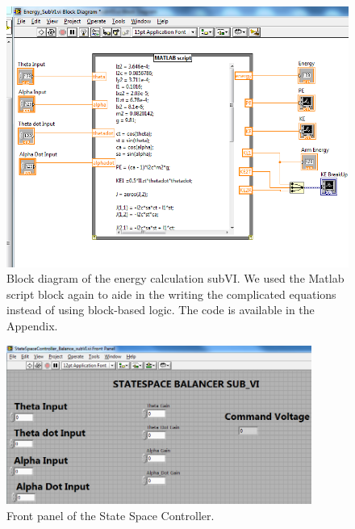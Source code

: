 \documentclass{article}
\theoremstyle{plain}
\theoremstyle{definition}
\theoremstyle{remark}
\begin{document}
\begin{figure}[htb]
\begin{center}
\includegraphics[width = 14cm]{q6_b6.png}
\end{center}
\caption{Block diagram of the energy calculation subVI. We used the Matlab script block again to aide in the writing the complicated equations instead of using block-based logic. The code is available in the Appendix.}
\label{q6_b6}
\end{figure}


\begin{figure}[htb]
\begin{center}
\includegraphics[width = 10cm]{q6_b7.png}
\end{center}
\caption{Front panel of the State Space Controller.}
\label{q6_b7}
\end{figure}
\end{document}
